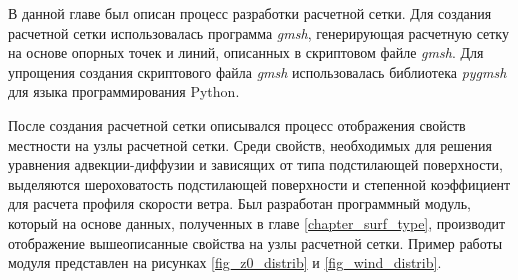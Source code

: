 В данной главе был описан процесс разработки расчетной сетки. Для создания расчетной сетки использовалась программа 
\textit{gmsh}, генерирующая расчетную сетку на основе опорных точек и линий, описанных в скриптовом файле \textit{gmsh}. 
Для упрощения создания скриптового файла \textit{gmsh} использовалась библиотека \textit{pygmsh} для языка 
программирования Python. 

После создания расчетной сетки описывался процесс отображения свойств местности на узлы расчетной сетки. Среди свойств, 
необходимых для решения уравнения адвекции-диффузии и зависящих от типа подстилающей поверхности, выделяются 
шероховатость подстилающей поверхности и степенной коэффициент для расчета профиля скорости ветра. Был разработан 
программный модуль, который на основе данных, полученных в главе \ref{chapter_surf_type}, производит отображение 
вышеописанные свойства на узлы расчетной сетки. Пример работы модуля представлен на рисунках \ref{fig_z0_distrib} и 
\ref{fig_wind_distrib}.
